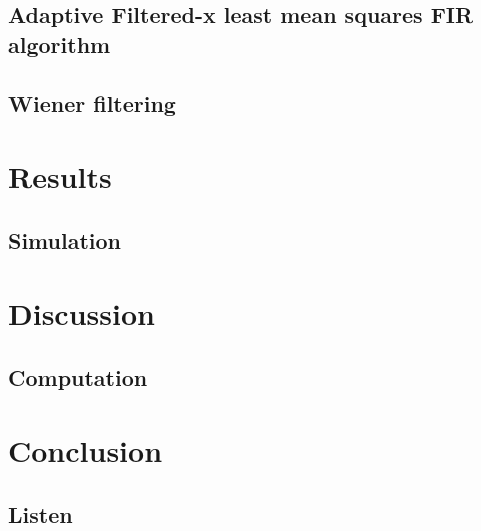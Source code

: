 \subsection{Adaptive Filtered-x least mean squares FIR algorithm}

\subsection{Wiener filtering}

\section{Results}

\subsection{Simulation}


\section{Discussion}

\subsection{Computation}

\section{Conclusion}

\subsection{Listen}
